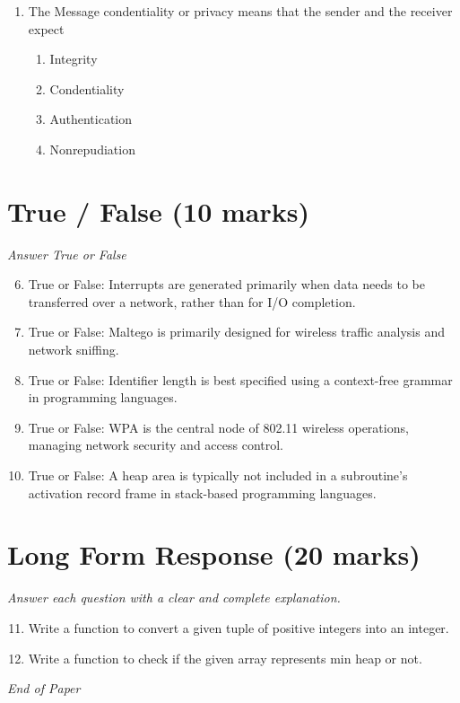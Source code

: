 \documentclass[12pt]{article}
\begin{document}
\begin{enumerate}[label=\arabic*.]
\begin{enumerate}[label=(\alph*)]
    \item Morris Worm
    \item Code Red
\end{enumerate}
\item The Message condentiality or privacy means that the sender and the receiver expect
\begin{enumerate}[label=(\alph*)]
    \item Integrity
    \item Condentiality
    \item Authentication
    \item Nonrepudiation
\end{enumerate}
\end{enumerate}

\section*{True / False (10 marks)}
\textit{Answer True or False}
\begin{enumerate}[label=\arabic*.]
\setcounter{enumi}{5}
\item True or False: Interrupts are generated primarily when data needs to be transferred over a network, rather than for I/O completion.
\item True or False: Maltego is primarily designed for wireless traffic analysis and network sniffing.
\item True or False: Identifier length is best specified using a context-free grammar in programming languages.
\item True or False: WPA is the central node of 802.11 wireless operations, managing network security and access control.
\item True or False: A heap area is typically not included in a subroutine's activation record frame in stack-based programming languages.
\end{enumerate}

\section*{Long Form Response (20 marks)}
\textit{Answer each question with a clear and complete explanation.}
\begin{enumerate}[label=\arabic*.]
\setcounter{enumi}{10}
\item Write a function to convert a given tuple of positive integers into an integer.
\item Write a function to check if the given array represents min heap or not.
\end{enumerate}

\vfill
\noindent\textit{End of Paper}
\end{document}
